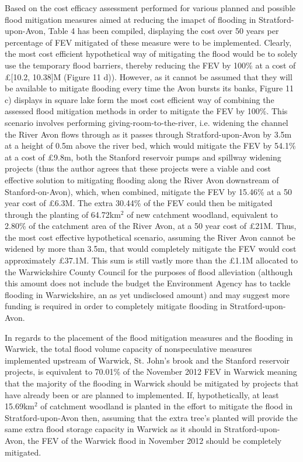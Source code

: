 \documentclass[11pt,a4paper]{article}
\begin{document}
Based on the cost efficacy assessment performed for various planned and possible flood mitigation measures aimed at reducing the imapct of flooding in Stratford-upon-Avon, Table 4 has been compiled, displaying the cost over 50 years per percentage of FEV mitigated of these measure were to be implemented. Clearly, the most cost efficient hypothetical way of mitigating the flood would be to solely use the temporary flood barriers, thereby reducing the FEV by 100\% at a cost of \pounds[10.2, 10.38]M (Figure 11 d)). However, as it cannot be assumed that they will be available to mitigate flooding every time the Avon bursts its banks, Figure 11 c) displays in square lake form the most cost efficient way of combining the assessed flood mitigation methods in order to mitigate the FEV by 100\%. This scenario involves performing giving-room-to-the-river, i.e. widening the channel the River Avon flows through as it passes through Stratford-upon-Avon by 3.5m at a height of 0.5m above the river bed, which would mitigate the FEV by 54.1\% at a cost of \pounds9.8m, both the Stanford reservoir pumps and spillway widening projects (thus the author agrees that these projects were a viable and cost effective solution to mitigating flooding along the River Avon downstream of Stanford-on-Avon), which, when combined, mitigate the FEV by 15.46\% at a 50 year cost of \pounds6.3M. The extra 30.44\% of the FEV could then be mitigated through the planting of 64.72km$^2$ of new catchment woodland, equivalent to 2.80\% of the catchment area of the River Avon, at a 50 year cost of \pounds21M. Thus, the most cost effective hypothetical scenario, assuming the River Avon cannot be widened by more than 3.5m, that would completely mitigate the FEV would cost approximately \pounds37.1M. This sum is still vastly more than the \pounds1.1M allocated to the Warwickshire County Council \cite{war1} for the purposes of flood alleviation (although this amount does not include the budget the Environment Agency has to tackle flooding in Warwickshire, an as yet undisclosed amount) and may suggest more funding is required in order to completely mitigate flooding in Stratford-upon-Avon.

In regards to the placement of the flood mitigation measures and the flooding in Warwick, the total flood volume capacity of nonspeculative measures implemented upstream of Warwick, St. John's brook and the Stanford reservoir projects, is equivalent to 70.01\% of the November 2012 FEV in Warwick meaning that the majority of the flooding in Warwick should be mitigated by projects that have already been or are planned to implemented. If, hypothetically, at least 15.69km$^2$ of catchment woodland is planted in the effort to mitigate the flood in Stratford-upon-Avon then, assuming that the extra tree's planted will provide the same extra flood storage capacity in Warwick as it should in Stratford-upon-Avon, the FEV of the Warwick flood in November 2012 should be completely mitigated.
\end{document}
